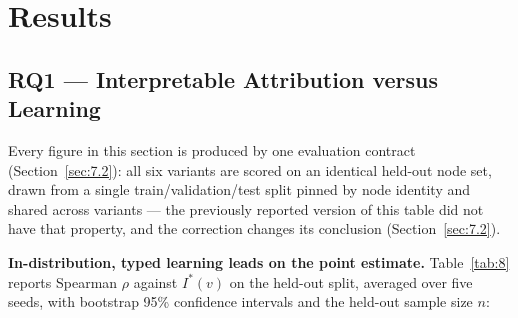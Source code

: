 \hypertarget{results}{%
\section{Results}\label{results}}

\label{sec:8}

\hypertarget{rq1-interpretable-attribution-versus-learning}{%
\subsection{RQ1 --- Interpretable Attribution versus Learning}\label{rq1-interpretable-attribution-versus-learning}}

\label{sec:8.1}

Every figure in this section is produced by one evaluation contract (Section~\ref{sec:7.2}): all six
variants are scored on an identical held-out node set, drawn from a single train/validation/test
split pinned by node identity and shared across variants --- the previously reported version of this
table did not have that property, and the correction changes its conclusion (Section~\ref{sec:7.2}).

\textbf{In-distribution, typed learning leads on the point estimate.} Table~\ref{tab:8} reports
Spearman \(\rho\) against \(I^*(v)\) on the held-out split, averaged over five seeds, with bootstrap
95\% confidence intervals and the held-out sample size \(n\):

